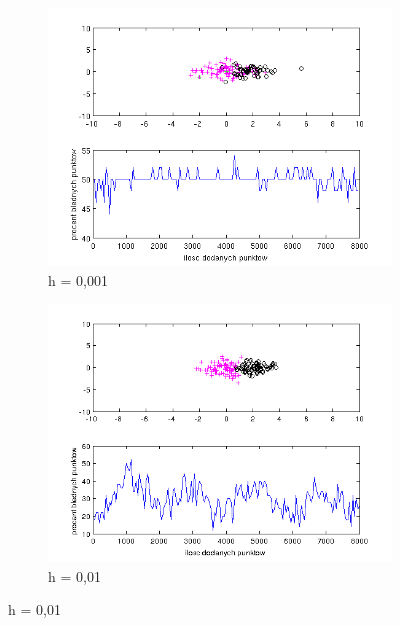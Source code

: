 \documentclass[10pt,a4paper]{article}
\begin{document}
\begin{figure}[H]

   \begin{subfigure}[b]{0.5\textwidth}
    \includegraphics[width=\textwidth]{test3_h0_001_50_00.png}
    \caption{h = 0,001}
  \end{subfigure}
  \hfill
  \begin{subfigure}[b]{0.5\textwidth}
    \includegraphics[width=\textwidth]{test3_h0_01_29_7.png}
    \caption{h = 0,01}
  \end{subfigure}
  

\end{figure}
\end{document}
